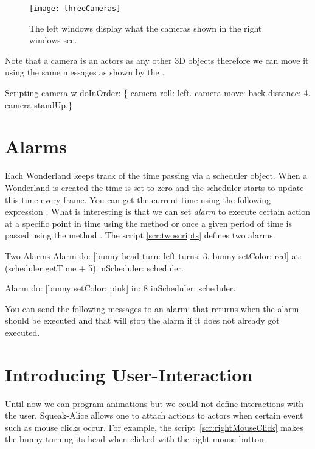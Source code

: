 \begin{figure}
\begin{center}\texttt{[image: threeCameras]}\end{center}
\caption{The left windows display what the cameras shown in the right windows
see.  \label{fig:threecamera}}
\end{figure}

Note that a camera is an actors as any other 3D objects therefore we can 
move it using the same messages as shown by the .

\begin{scriptwithtitle}{Scripting camera}\label{scr:scriptingCamera}
w doInOrder: \{
   camera roll: left.
   camera move: back distance: 4.
   camera standUp.\}
\end{scriptwithtitle}

\section{Alarms}
Each Wonderland keeps track of the time passing via a scheduler object. When a Wonderland is created the time is set to zero and 
the scheduler starts to update this time every frame. You  can get the current time using the following expression .
What is interesting is that we can set \textit{alarm} to execute certain action at a specific point in time using the method  or once a given period of time is passed using the method . 
The script \ref{scr:twoscripts} defines two alarms. 

\begin{scriptwithtitle}{Two Alarms}\label{scr:twoscripts}
Alarm
    do: 
       [bunny head turn: left turns: 3. 
       bunny setColor: red]
    at: (scheduler getTime + 5)
    inScheduler: scheduler.
    
Alarm
    do: [bunny setColor: pink]
    in:  8
    inScheduler: scheduler.
\end{scriptwithtitle}

You can send the following messages to an alarm:  that returns when the alarm should be executed and 
that will stop the alarm if it does not already got executed.

\section{Introducing User-Interaction}
Until now we can program animations but we could not define interactions with the user.  
Squeak-Alice allows one to attach actions to actors when certain event such as mouse clicks occur.
For example, the script~\ref{scr:rightMouseClick} makes the bunny turning its head when clicked with the 
right mouse button.

